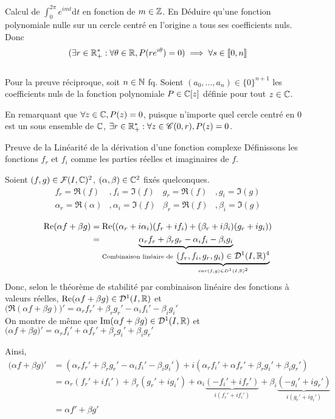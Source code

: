 \documentclass{article}
\begin{document}
\begin{question_kholle}{Calcul de $\int_0^{2\pi}e^{imt} \mathrm d t$ en fonction de $m \in \mathbb Z$. En Déduire qu'une fonction polynomiale nulle sur un cercle centré en l'origine a tous ses coefficients nuls.}
	Donc $$
		(\exists r \in \mathbb R_+^* : \forall \theta \in \mathbb R, P(re^{i\theta})=0) \implies \forall s \in [ \! [0, n] \! ]
	$$
	\\
	Pour la preuve réciproque,  soit $n \in \mathbb N$ fq. Soient $(a_0,...,a_n) \in \{ 0 \} ^{n+1}$ les coefficients nuls de la fonction polynomiale $P \in \mathbb C[z]$ définie pour tout $z \in \mathbb C$.
	
	En remarquant que $\forall z \in \mathbb C , P(z) = 0$, puisque n'importe quel cercle centré en 0 est un sous ensemble de $\mathbb C$,  $\exists r \in \mathbb R_+^*: \forall z \in \mathscr C(0, r), P(z) = 0$.
\end{question_kholle}

\begin{question_kholle}{Preuve de la Linéarité de la dérivation d'une fonction complexe}
	Définissons les fonctions $f_r$ et $f_i$ comme les parties réelles et imaginaires de $f$.

	Soient $(f, g) \in \mathcal{F}(I, \mathbb C)^2$, $(\alpha, \beta) \in \mathbb C^2$ fixés quelconques.
	\begin{align*}
		f_r = \Re(f) &, f_i = \Im(f) &g_r = \Re(f) &, g_i = \Im(g)\\
		\alpha_r = \Re(\alpha) &, \alpha_i = \Im(f) &\beta_r = \Re(f) &, \beta_i = \Im(g)
	\end{align*}
	
	\begin{align*}
		\text{Re}( \alpha f + \beta g) &= \text{Re}((\alpha_r + i \alpha_i)(f_r + i f_i) + (\beta_r+ i\beta_i)(g_r+ i g_i)) \\
		&= \underbrace{\alpha_r f_r + \beta_r g_r - \alpha_i f_i - \beta_i g_i}_{\text{Combinaison linéaire de } \underbrace{(f_r, f_i, g_r, g_i) \in \mathcal D^1(I, \mathbb R)^4}_{car (f,g) \in D^1(I, \mathbb R)^2}}
	\end{align*}
	Donc, selon le théorème de stabilité par combinaison linéaire des fonctions à valeurs réelles, $\text{Re}(\alpha f + \beta g) \in \mathcal D^1(I, \mathbb R)$ et $\big(\Re(\alpha f + \beta g)\big)' = \alpha_r f_r' + \beta_r g_r' - \alpha_i f_i' - \beta_i g_i'$
	\\
	On montre de même que $\text{Im}(\alpha f + \beta g) \in \mathcal D^1(I, \mathbb R)$ et $\big(\alpha f + \beta g\big)' = \alpha_r f_i' +\alpha f_r' +\beta_r g_i' +\beta_i g_r'$
	
	Ainsi,
	\begin{align*}
		\big( \alpha f + \beta g \big)' &= (\alpha_r f_r' + \beta_r g_r' - \alpha_i f_i' - \beta_i g_i') + i (\alpha_r f_i' +\alpha f_r' +\beta_r g_i' +\beta_i g_r') \\
		&= \alpha_r(f_r' + if_i') + \beta_r(g_r' + ig_i') + \alpha_i \underbrace{(-f_i' + if_r')}_{i(f_r' + if_i')} + \beta_i \underbrace{( -g_i' + ig_r')}_{i(g_r' + ig_i')} \\
		&=\alpha f' + \beta g'
	\end{align*}
\end{question_kholle}
\end{document}
